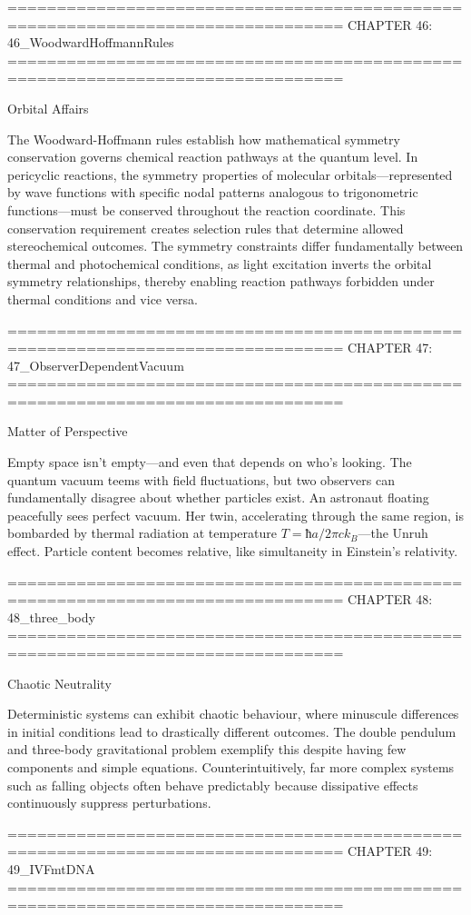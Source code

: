 ================================================================================
CHAPTER 46: 46_WoodwardHoffmannRules
================================================================================

Orbital Affairs

The Woodward-Hoffmann rules establish how mathematical symmetry conservation governs chemical reaction pathways at the quantum level. In pericyclic reactions, the symmetry properties of molecular orbitals—represented by wave functions with specific nodal patterns analogous to trigonometric functions—must be conserved throughout the reaction coordinate. This conservation requirement creates selection rules that determine allowed stereochemical outcomes. The symmetry constraints differ fundamentally between thermal and photochemical conditions, as light excitation inverts the orbital symmetry relationships, thereby enabling reaction pathways forbidden under thermal conditions and vice versa.


================================================================================
CHAPTER 47: 47_ObserverDependentVacuum
================================================================================

Matter of Perspective

Empty space isn't empty—and even that depends on who's looking. The quantum vacuum teems with field fluctuations, but two observers can fundamentally disagree about whether particles exist. An astronaut floating peacefully sees perfect vacuum. Her twin, accelerating through the same region, is bombarded by thermal radiation at temperature $T = ħa/2πck_B$—the Unruh effect. Particle content becomes relative, like simultaneity in Einstein's relativity.


================================================================================
CHAPTER 48: 48_three_body
================================================================================

Chaotic Neutrality

Deterministic systems can exhibit chaotic behaviour, where minuscule differences in initial conditions lead to drastically different outcomes. The double pendulum and three-body gravitational problem exemplify this despite having few components and simple equations. Counterintuitively, far more complex systems such as falling objects often behave predictably because dissipative effects continuously suppress perturbations.


================================================================================
CHAPTER 49: 49_IVFmtDNA
================================================================================

